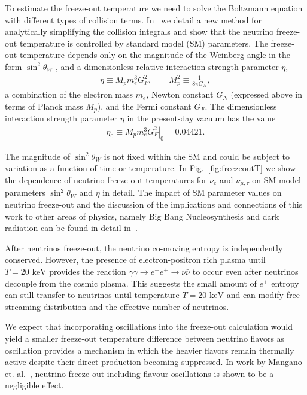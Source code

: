 \documentclass[universe,article,submit,moreauthors,pdftex,a4paper]{Definitions/mdpi}
\newcommand{\keV}{\text{ keV}}
\newcommand*{\rf}[1]{Fig.~{\ref{#1}}}
\begin{document}
 To estimate the freeze-out temperature we need to solve the Boltzmann equation with different types of collision terms. In~\cite{Birrell:2014uka} we detail a new method for analytically simplifying the collision integrals and show that the neutrino freeze-out temperature is controlled by standard model (SM) parameters. The freeze-out temperature depends only on the magnitude of the Weinberg angle in the form $\sin^2\theta_W$ , and a dimensionless relative interaction strength parameter $\eta$,
\begin{align}
\eta\equiv M_p m_e^3 G_F^2, \qquad M_p^2\equiv \frac{1}{8\pi G_N}, \end{align}
a combination of the electron mass $m_e$, Newton constant $G_N$ (expressed above in terms of Planck mass $M_p$), and the Fermi constant $G_F$. The dimensionless interaction strength parameter $\eta$ in the present-day vacuum has the value
\begin{align}
\eta_0\equiv \left.M_p m_e^3 G_F^2\right|_0 = 0.04421 .
\end{align}

The magnitude of $\sin^2\theta_W$ is not fixed within the SM and could be subject to variation as a function of time or temperature. In \rf{fig:freezeoutT} we show the dependence of neutrino freeze-out temperatures for $\nu_e$ and $\nu_{\mu,\tau}$ on SM model parameters $\sin^2\theta_W$ and $\eta$ in detail. The impact of SM parameter values on neutrino freeze-out and the discussion of the implications and connections of this work to other areas of physics, namely Big Bang Nucleosynthesis and dark radiation can be found in detail in~\cite{Dreiner:2011fp,Boehm:2012gr,Blennow:2012de,Birrell:2014uka}.

After neutrinos freeze-out, the neutrino co-moving entropy is independently conserved. However, the presence of electron-positron rich plasma until $T=20\keV$ provides the reaction $\gamma\gamma\to e^-e^+\to\nu\bar{\nu}$ to occur even after neutrinos decouple from the cosmic plasma. This suggests the small amount of $e^\pm$ entropy can still transfer to neutrinos until temperature $T=20\keV$ and can modify free streaming distribution and the effective number of neutrinos.

We expect that incorporating oscillations into the freeze-out calculation would yield a smaller freeze-out temperature difference between neutrino flavors as oscillation provides a mechanism in which the heavier flavors remain thermally active despite their direct production becoming suppressed. In work by Mangano et. al.~\cite{Mangano:2005cc}, neutrino freeze-out including flavour oscillations is shown to be a negligible effect.
\end{document}
